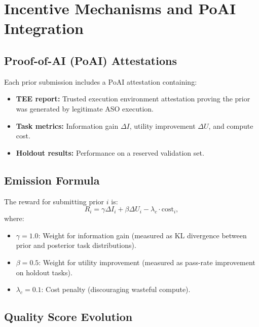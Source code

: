 \section{Incentive Mechanisms and PoAI Integration}

\label{sec:incentives}

\subsection{Proof-of-AI (PoAI) Attestations}

Each prior submission includes a PoAI attestation containing:
\begin{itemize}[leftmargin=1.5em]
    \item \textbf{TEE report:} Trusted execution environment attestation proving
          the prior was generated by legitimate ASO execution.
    \item \textbf{Task metrics:} Information gain $\Delta I$, utility improvement
          $\Delta U$, and compute cost.
    \item \textbf{Holdout results:} Performance on a reserved validation set.
\end{itemize}

\subsection{Emission Formula}

The reward for submitting prior $i$ is:
\begin{equation}
    R_i = \gamma \Delta I_i + \beta \Delta U_i - \lambda_c \cdot \text{cost}_i,
    \label{eq:emission}
\end{equation}
where:
\begin{itemize}[leftmargin=1.5em]
    \item $\gamma = 1.0$: Weight for information gain (measured as KL divergence
          between prior and posterior task distributions).
    \item $\beta = 0.5$: Weight for utility improvement (measured as
          pass-rate improvement on holdout tasks).
    \item $\lambda_c = 0.1$: Cost penalty (discouraging wasteful compute).
\end{itemize}

\subsection{Quality Score Evolution}

